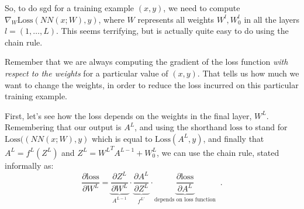 So, to do {\sc sgd} for a training example $(x, y)$, we need to
compute $\nabla_W \text{Loss}(NN(x;W),y)$, 
where $W$ represents all weights $W^l, W_0^l$ in all the layers $l =
(1, \ldots, L)$. This seems terrifying,
but is actually quite easy to do using the chain rule. 

Remember that we are always computing the gradient of the loss
function {\em with respect to the weights} for a particular value of
$(x,  y)$.  That tells us how much we want to change the weights, in
order to reduce the loss incurred on this particular training example.

First, let's see how the loss depends on the weights in the final
layer, $W^L$.  Remembering that our output is $A^L$, and using the
shorthand $\text{loss}$ to stand for $\text{Loss}((NN(x;W),y)$ which
is equal to $\text{Loss}(A^L, y)$, and finally that $A^L = f^L(Z^L)$ and
$Z^L = {W^L}^T A^{L-1} +W_0^L$, we can use the chain rule, stated informally as:
\[
  \frac{\partial \text{loss}}{\partial W^L} = 
  \underbrace{\frac{\partial Z^L}{\partial W^L}}_{\text{$A^{L-1}$}}
\cdot
  \underbrace{\frac{\partial A^L}{\partial Z^L}}_{f^{L'}} 
\cdot
\underbrace{
  \frac{\partial \text{loss}}{\partial A^L}}_{\text{depends on loss
  function}} 
\;\;.\]

\def\bea{\begin{eqnarray}}
\def\eea{\end{eqnarray}}


